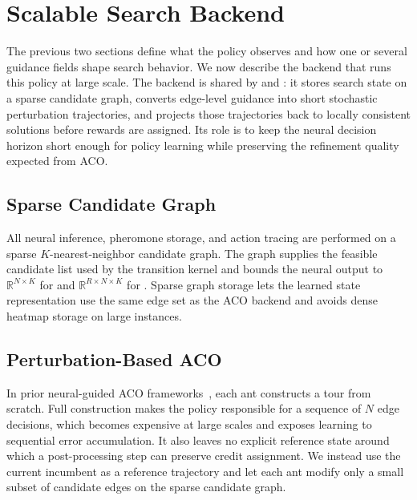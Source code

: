 \section{Scalable Search Backend}
\label{sec:computational-alignment}
\label{sec:backend}

The previous two sections define what the policy observes and how one or several guidance fields shape search behavior. We now describe the backend that runs this policy at large scale. The backend is shared by \DyNACO{} and \DyNACS{}: it stores search state on a sparse candidate graph, converts edge-level guidance into short stochastic perturbation trajectories, and projects those trajectories back to locally consistent solutions before rewards are assigned. Its role is to keep the neural decision horizon short enough for policy learning while preserving the refinement quality expected from ACO\@.

\subsection{Sparse Candidate Graph}
\label{sec:sparse-candidate-graph}

All neural inference, pheromone storage, and action tracing are performed on a sparse $K$-nearest-neighbor candidate graph. The graph supplies the feasible candidate list used by the transition kernel and bounds the neural output to $\mathbb{R}^{N\times K}$ for \DyNACO{} and $\mathbb{R}^{R\times N\times K}$ for \DyNACS{}. Sparse graph storage lets the learned state representation use the same edge set as the ACO backend and avoids dense heatmap storage on large instances.

\subsection{Perturbation-Based ACO}
\label{sec:perturbation-aco}

In prior neural-guided ACO frameworks~\cite{deepaco,gfacs,gtgaco}, each ant constructs a tour from scratch. Full construction makes the policy responsible for a sequence of $N$ edge decisions, which becomes expensive at large scales and exposes learning to sequential error accumulation. It also leaves no explicit reference state around which a post-processing step can preserve credit assignment. We instead use the current incumbent as a reference trajectory and let each ant modify only a small subset of candidate edges on the sparse candidate graph.

